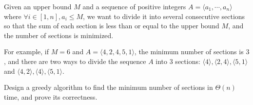 
Given an upper bound \(M\) and a sequence of positive integers \(A=\langle a_1,\cdots,a_n\rangle\) where \(\forall i \in [1, n], a_i \leq M\), we want to divide it into several consecutive sections so that the sum of each section is less than or equal to the upper bound \(M\), and the number of sections is minimized.

For example, if \(M=6\) and \(A=\langle 4,2,4,5,1\rangle\), the minimum number of sections is \(3\), and there are two ways to divide the sequence \(A\) into \(3\) sections: \(\langle 4\rangle,\langle 2,4\rangle,\langle 5,1\rangle\) and \(\langle 4,2\rangle,\langle 4\rangle,\langle 5,1\rangle\).

Design a greedy algorithm to find the minimum number of sections in \(\Theta(n)\) time, and prove its correctness.



